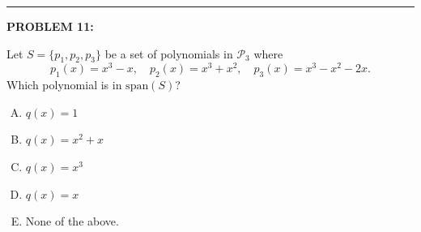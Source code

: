 \documentclass[12pt]{amsart}
\newcommand{\divider}{
  \vspace{-1em} %
  \noindent
  \raisebox{-0.15ex}{\textbullet}%
  \hspace{0.5em}%
  \rule[0.5ex]{0.95\textwidth}{1.0pt}%
  \hspace{0.5em}%
  \raisebox{-0.15ex}{\textbullet}%
  \vspace{0em} %
}
\begin{document}

\divider

{\bf PROBLEM 11:}

Let $S = \{p_1, p_2, p_3\}$ be a set of polynomials in $\mathcal{P}_3$ where
$$p_1(x) = x^3 - x, \quad p_2(x) = x^3 + x^2, \quad p_3(x) = x^3 - x^2 - 2x.$$
Which polynomial is in $\text{span}(S)$?

\begin{enumerate}[(A)]
\item $q(x) = 1$
\item $q(x) = x^2 + x$
\item $q(x) = x^3$
\item $q(x) = x$
\item None of the above.
\end{enumerate}

\end{document}
